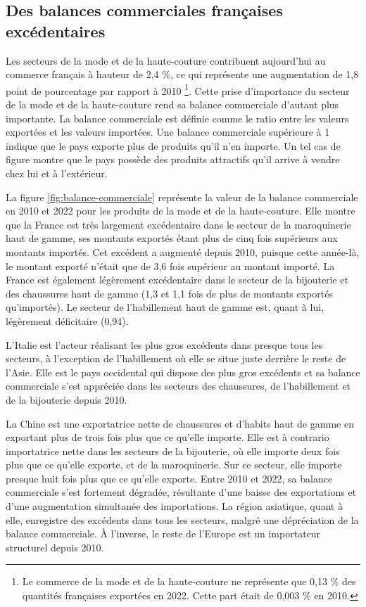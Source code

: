 \documentclass[french,10pt,a4paper]{article}
\begin{document}
\subsection{Des balances commerciales françaises excédentaires}
Les secteurs de la mode et de la haute-couture contribuent aujourd'hui au commerce français à hauteur de 2,4 \%, ce qui représente une augmentation de 1,8 point de pourcentage par rapport à 2010 \footnote{Le commerce de la mode et de la haute-couture ne représente que 0,13 \% des quantités françaises exportées en 2022. Cette part était de 0,003 \% en 2010.}. Cette prise d'importance du secteur de la mode et de la haute-couture rend sa balance commerciale d'autant plus importante. La balance commerciale est définie comme le ratio entre les valeurs exportées et les valeurs importées. Une balance commerciale supérieure à 1 indique que le pays exporte plus de produits qu'il n'en importe. Un tel cas de figure montre que le pays possède des produits attractifs qu'il arrive à vendre chez lui et à l'extérieur.

\bigskip

La figure \ref{fig:balance-commerciale} représente la valeur de la balance commerciale en 2010 et 2022 pour les produits de la mode et de la haute-couture. Elle montre que la France est très largement excédentaire dans le secteur de la maroquinerie haut de gamme, ses montants exportés étant plus de cinq fois supérieurs aux montants importés. Cet excédent a augmenté depuis 2010, puisque cette année-là, le montant exporté n'était que de 3,6 fois supérieur au montant importé. La France est également légèrement excédentaire dans le secteur de la bijouterie et des chaussures haut de gamme (1,3 et 1,1 fois de plus de montants exportés qu'importés). Le secteur de l'habillement haut de gamme est, quant à lui, légèrement déficitaire (0,94).

L'Italie est l'acteur réalisant les plus gros excédents dans presque tous les secteurs, à l'exception de l'habillement où elle se situe juste derrière le reste de l'Asie. Elle est le pays occidental qui dispose des plus gros excédents et sa balance commerciale s'est appréciée dans les secteurs des chaussures, de l'habillement et de la bijouterie depuis 2010.

La Chine est une exportatrice nette de chaussures et d'habits haut de gamme en exportant plus de trois fois plus que ce qu'elle importe. Elle est à contrario importatrice nette dans les secteurs de la bijouterie, où elle importe deux fois plus que ce qu'elle exporte, et de la maroquinerie. Sur ce secteur, elle importe presque huit fois plus que ce qu'elle exporte. Entre 2010 et 2022, sa balance commerciale s'est fortement dégradée, résultante d'une baisse des exportations et d'une augmentation simultanée des importations. La région asiatique, quant à elle, enregistre des excédents dans tous les secteurs, malgré une dépréciation de la balance commerciale. À l'inverse, le reste de l'Europe est un importateur structurel depuis 2010. 
\end{document}
